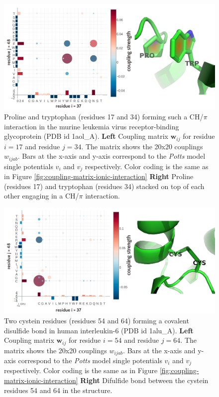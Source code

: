 \documentclass[11pt,a4paper,twoside]{book}
\newcommand{\eq}{\!=\!}
\newcommand{\vi}{v_{i}}
\newcommand{\vj}{v_{j}}
\newcommand{\wij}{\mathbf{w}_{ij}}
\newcommand{\wijab}{w_{ijab}}
\theoremstyle{definition}
\theoremstyle{definition}
\theoremstyle{remark}
\begin{document}
\begin{figure}
\includegraphics[width=1\linewidth]{img/coupling_matrix_analysis/proline_aromatic_interaction_combined} \caption{Proline and
tryptophan (residues 17 and 34) forming such a CH/\(\pi\) interaction in
the murine leukemia virus receptor-binding glycoprotein (PDB id
1aol\_A). \textbf{Left} Coupling matrix \(\wij\) for residue \(i\eq17\)
and residue \(j\eq34\). The matrix shows the 20x20 couplings \(\wijab\).
Bars at the x-axis and y-axis correspond to the \emph{Potts} model
single potentials \(\vi\) and \(\vj\) respectively. Color coding is the
same as in Figure \ref{fig:coupling-matrix-ionic-interaction}
\textbf{Right} Proline (residues 17) and tryptophan (residues 34)
stacked on top of each other engaging in a CH/\(\pi\) interaction.}\label{fig:coupling-matrix-aromatic-proline-pymol}
\end{figure}











\begin{figure}
\includegraphics[width=1\linewidth]{img/coupling_matrix_analysis/disulfide_interaction_combined} \caption{Two cystein residues
(residues 54 and 64) forming a covalent disulfide bond in human
interleukin-6 (PDB id 1alu\_A). \textbf{Left} Coupling matrix \(\wij\)
for residue \(i\eq54\) and residue \(j\eq64\). The matrix shows the
20x20 couplings \(\wijab\). Bars at the x-axis and y-axis correspond to
the \emph{Potts} model single potentials \(\vi\) and \(\vj\)
respectively. Color coding is the same as in Figure
\ref{fig:coupling-matrix-ionic-interaction} \textbf{Right} Difulfide
bond between the cystein residues 54 and 64 in the structure.}\label{fig:coupling-matrix-disulfide-pymol}
\end{figure}
\end{document}
